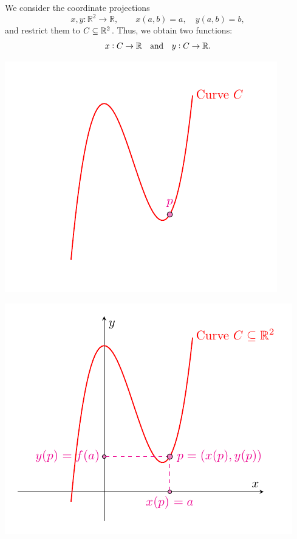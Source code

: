 \documentclass[11pt,openany]{article}
\begin{document}
\newpage\noindent
We consider the coordinate projections \[
x,y\colon\mathbb{R}^2\to\mathbb{R},
\qquad
x(a,b)=a,
\quad
y(a,b)=b,
\] and restrict them to \(C\subseteq\mathbb{R}^2\). Thus, we obtain two functions: \[
x:C\to\mathbb{R}\quad\text{and}\quad y:C\to\mathbb{R}.
\] 
\begin{center}
\begin{minipage}{.49\textwidth}\centering
	\includegraphics[scale=1]{tangent-space-5-1.pdf}
\end{minipage}\hfill
\begin{minipage}{.49\textwidth}\centering
	\includegraphics[scale=1]{tangent-space-5-2.pdf}
\end{minipage}
\end{center}
\end{document}
